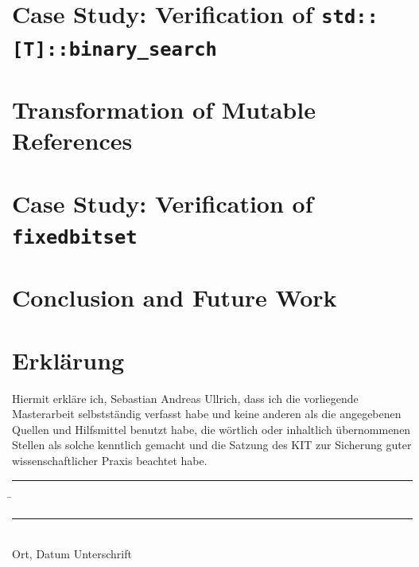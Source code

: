 \documentclass[12pt,a4paper,twoside]{article}
\begin{document}
\cleardoublepage
\pagestyle{fancy}
\fancyhf{}
\fancyhead[LE,RO]{\thepage}
\fancyhead[RE,LO]{\textit\leftmark}


\newpage

\newpage

\newpage



\newpage
\section{Case Study: Verification of \texttt{std::[T]::binary\_search}}
\label{sec:binary_search}

\section{Transformation of Mutable References}
\label{sec:mutref}

\section{Case Study: Verification of \texttt{fixedbitset}}
\label{sec:fixedbitset}

\section{Conclusion and Future Work}

\newpage



\cleardoublepage
\pagestyle{empty}
\section*{Erklärung}

  \vspace{20mm}
  Hiermit erkläre ich, Sebastian Andreas Ullrich, dass ich die vorliegende Masterarbeit selbst\-ständig
verfasst habe und keine anderen als die angegebenen Quellen und Hilfsmittel
benutzt habe, die wörtlich oder inhaltlich übernommenen Stellen als solche kenntlich gemacht und
die Satzung des KIT zur Sicherung guter wissenschaftlicher Praxis beachtet habe.
  \vspace{20mm}
  \begin{tabbing}
  \rule{4cm}{.4pt}\hspace{1cm} \= \rule{7cm}{.4pt} \\
 Ort, Datum \> Unterschrift
  \end{tabbing}
\end{document}
